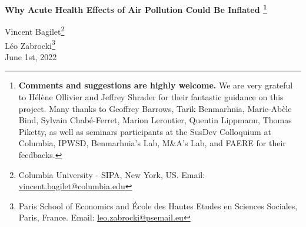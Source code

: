 \documentclass[12pt]{article}
\renewcommand{\thefootnote}{\fnsymbol{footnote}}
\begin{document}



\begin{titlepage}
\vspace*{-2cm}
\begin{flushleft}
\Huge{}\selectfont\textbf{Why Acute Health Effects of Air Pollution Could Be Inflated \footnote[2]{\textbf{Comments and suggestions are highly welcome.} We are very grateful to Hélène Ollivier and Jeffrey Shrader for their fantastic guidance on this project. Many thanks to Geoffrey Barrows, Tarik Benmarhnia, Marie-Abèle Bind, Sylvain Chabé-Ferret, Marion Leroutier, Quentin Lippmann, Thomas Piketty, as well as seminars participants at the SusDev Colloquium at Columbia, IPWSD, Benmarhnia's Lab,  M\&A's Lab, and FAERE for their feedbacks.}}
\end{flushleft}
\renewcommand{\thefootnote}{\arabic{footnote}}
\vspace*{0.1cm} 
\begin{flushleft}
{\large
Vincent Bagilet\footnote{Columbia University - SIPA, New York, US. Email: \url{vincent.bagilet@columbia.edu}}\\[3pt] 
Léo Zabrocki\footnote{Paris School of Economics and
École des Hautes Etudes en Sciences Sociales, Paris, France. Email: \url{leo.zabrocki@psemail.eu}}
\\ [0.3cm] 
\normalsize{June 1st, 2022} \\
}

\end{flushleft}


\begin{abstract}
\small
\noindent Accurate and precise measurements of the short-term effects of air pollution on health play a key role in setting air quality standards. Yet, statistical power calculations are rarely---if ever---carried out. We first collect estimates and standard errors of all available articles found in the epidemiology and economics literatures. We find that nearly half of them may suffer from a low statistical power and could thereby produce statistically significant estimates that are actually inflated. We then run simulations based on real data to identify which parameters of research designs affect statistical power. Despite their large sample sizes, we show that studies exploiting rare exogenous shocks such as transport strikes or thermal inversions could have a very low statistical power, even if effect sizes are large. Our simulation results indicate that the observed discrepancy in the literature between instrumental variable estimates and non-causal ones could be partly explained by the inherent imprecision of the two-stage least-squares estimator. We also provide evidence that subgroup analysis on the elderly or children should be implemented with caution since the average number of events for an health outcome is a major driver of power. Based on these findings, we build a series of recommendations for researchers to evaluate the design of their study with respect to statistical power issues.


\end{abstract}
\end{titlepage}
\end{document}
